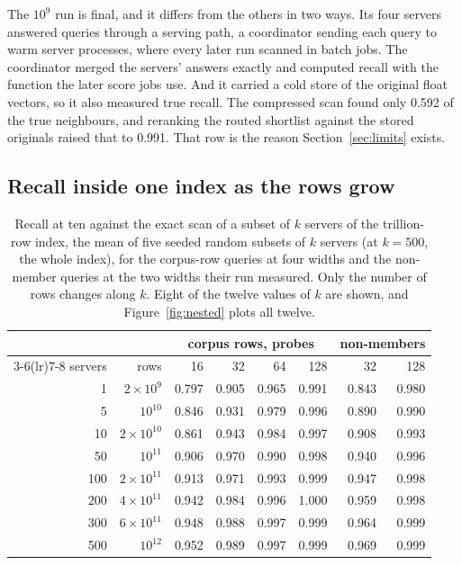 \documentclass[sigconf, nonacm]{acmart}
\begin{document}
The $10^{9}$ run is final, and it differs from the others in two ways. Its four servers answered
queries through a serving path, a coordinator sending each query to warm server processes, where
every later run scanned in batch jobs. The coordinator merged the servers' answers exactly and
computed recall with the function the later score jobs use. And it
carried a cold store of the original float vectors, so it also measured true recall. The compressed
scan found only 0.592 of the true neighbours, and reranking the routed shortlist against the stored
originals raised that to 0.991. That row is the reason Section~\ref{sec:limits} exists.

\subsection{Recall inside one index as the rows grow}
\label{sec:nested}

\begin{table}[t]
\caption{Recall at ten against the exact scan of a subset of $k$ servers of the trillion-row
index, the mean of five seeded random subsets of $k$ servers (at $k=500$, the whole index), for
the corpus-row queries at four widths and the non-member queries at the two widths their run
measured. Only the number of rows changes along $k$. Eight of the twelve values of $k$ are shown,
and Figure~\ref{fig:nested} plots all twelve.}
\label{tab:nested}
\centering
\small
\setlength{\tabcolsep}{3pt}
\begin{tabular}{rrrrrrrr}
\toprule
 & & \multicolumn{4}{c}{corpus rows, probes} & \multicolumn{2}{c}{non-members} \\
\cmidrule(lr){3-6}\cmidrule(lr){7-8}
servers & rows & 16 & 32 & 64 & 128 & 32 & 128 \\
\midrule
1   & $2\times10^{9}$  & 0.797 & 0.905 & 0.965 & 0.991 & 0.843 & 0.980 \\
5   & $10^{10}$        & 0.846 & 0.931 & 0.979 & 0.996 & 0.890 & 0.990 \\
10  & $2\times10^{10}$ & 0.861 & 0.943 & 0.984 & 0.997 & 0.908 & 0.993 \\
50  & $10^{11}$        & 0.906 & 0.970 & 0.990 & 0.998 & 0.940 & 0.996 \\
100 & $2\times10^{11}$ & 0.913 & 0.971 & 0.993 & 0.999 & 0.947 & 0.998 \\
200 & $4\times10^{11}$ & 0.942 & 0.984 & 0.996 & 1.000 & 0.959 & 0.998 \\
300 & $6\times10^{11}$ & 0.948 & 0.988 & 0.997 & 0.999 & 0.964 & 0.999 \\
500 & $10^{12}$        & 0.952 & 0.989 & 0.997 & 0.999 & 0.969 & 0.999 \\
\bottomrule
\end{tabular}
\end{table}
\end{document}
